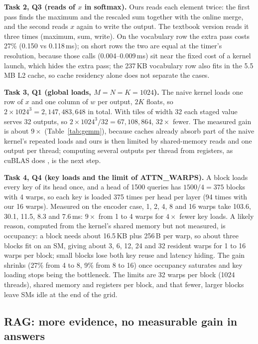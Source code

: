 \documentclass{article}
\begin{document}
\textbf{Task 2, Q3 (reads of $x$ in softmax).} Ours reads each element twice: the first pass finds the maximum and the rescaled sum together with the online merge, and the second reads $x$ again to write the output. The textbook version reads it three times (maximum, sum, write). On the vocabulary row the extra pass costs 27\% (0.150 vs 0.118\,ms); on short rows the two are equal at the timer's resolution, because those calls (0.004--0.009\,ms) sit near the fixed cost of a kernel launch, which hides the extra pass; the 237\,KB vocabulary row also fits in the 5.5\,MB L2 cache, so cache residency alone does not separate the cases.

\textbf{Task 3, Q1 (global loads, $M=N=K=1024$).} The naive kernel loads one row of $x$ and one column of $w$ per output, $2K$ floats, so $2\times1024^3 = 2{,}147{,}483{,}648$ in total. With tiles of width 32 each staged value serves 32 outputs, so $2\times1024^3/32 = 67{,}108{,}864$, $32\times$ fewer. The measured gain is about $9\times$ (Table~\ref{tab:gemm}), because caches already absorb part of the naive kernel's repeated loads and ours is then limited by shared-memory reads and one output per thread; computing several outputs per thread from registers, as cuBLAS does \citep{volkov2008benchmarking}, is the next step.

\textbf{Task 4, Q4 (key loads and the limit of ATTN\_WARPS).} A block loads every key of its head once, and a head of 1500 queries has $1500/4=375$ blocks with 4 warps, so each key is loaded 375 times per head per layer (94 times with our 16 warps). Measured on the encoder case, 1, 2, 4, 8 and 16 warps take 103.6, 30.1, 11.5, 8.3 and 7.6\,ms: $9\times$ from 1 to 4 warps for $4\times$ fewer key loads. A likely reason, computed from the kernel's shared memory but not measured, is occupancy: a block needs about 16.5\,KB plus 256\,B per warp, so about three blocks fit on an SM, giving about 3, 6, 12, 24 and 32 resident warps for 1 to 16 warps per block; small blocks lose both key reuse and latency hiding. The gain shrinks (27\% from 4 to 8, 9\% from 8 to 16) once occupancy saturates and key loading stops being the bottleneck. The limits are 32 warps per block (1024 threads), shared memory and registers per block, and that fewer, larger blocks leave SMs idle at the end of the grid.

\subsection{RAG: more evidence, no measurable gain in answers}
\end{document}

